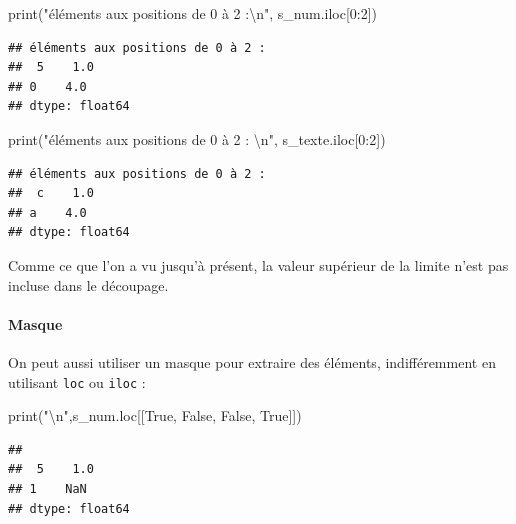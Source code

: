 \documentclass[12pt,]{book}
\newenvironment{Shaded}{\begin{snugshade}}{\end{snugshade}}
\newcommand{\DecValTok}[1]{\textcolor[rgb]{0.00,0.00,0.81}{#1}}
\newcommand{\CharTok}[1]{\textcolor[rgb]{0.31,0.60,0.02}{#1}}
\newcommand{\StringTok}[1]{\textcolor[rgb]{0.31,0.60,0.02}{#1}}
\newcommand{\VariableTok}[1]{\textcolor[rgb]{0.00,0.00,0.00}{#1}}
\newcommand{\BuiltInTok}[1]{#1}
\newcommand{\NormalTok}[1]{#1}
\let\oldparagraph\paragraph
\renewcommand{\paragraph}[1]{\oldparagraph{#1}\mbox{}}
\numberwithin{equation}{section}
\numberwithin{countremarque}{section}
\begin{document}
\begin{Shaded}
\begin{Highlighting}[]
\BuiltInTok{print}\NormalTok{(}\StringTok{"éléments aux positions de 0 à 2 :}\CharTok{\textbackslash{}n}\StringTok{"}\NormalTok{, s_num.iloc[}\DecValTok{0}\NormalTok{:}\DecValTok{2}\NormalTok{])}
\end{Highlighting}
\end{Shaded}

\begin{lstlisting}
## éléments aux positions de 0 à 2 :
##  5    1.0
## 0    4.0
## dtype: float64
\end{lstlisting}

\begin{Shaded}
\begin{Highlighting}[]
\BuiltInTok{print}\NormalTok{(}\StringTok{"éléments aux positions de 0 à 2 : }\CharTok{\textbackslash{}n}\StringTok{"}\NormalTok{, s_texte.iloc[}\DecValTok{0}\NormalTok{:}\DecValTok{2}\NormalTok{])}
\end{Highlighting}
\end{Shaded}

\begin{lstlisting}
## éléments aux positions de 0 à 2 : 
##  c    1.0
## a    4.0
## dtype: float64
\end{lstlisting}

Comme ce que l'on a vu jusqu'à présent, la valeur supérieur de la limite
n'est pas incluse dans le découpage.

\paragraph{Masque}\label{masque}

On peut aussi utiliser un masque pour extraire des éléments,
indifféremment en utilisant \texttt{loc} ou \texttt{iloc} :

\begin{Shaded}
\begin{Highlighting}[]
\BuiltInTok{print}\NormalTok{(}\StringTok{"}\CharTok{\textbackslash{}n}\StringTok{"}\NormalTok{,s_num.loc[[}\VariableTok{True}\NormalTok{, }\VariableTok{False}\NormalTok{, }\VariableTok{False}\NormalTok{, }\VariableTok{True}\NormalTok{]])}
\end{Highlighting}
\end{Shaded}

\begin{lstlisting}
## 
##  5    1.0
## 1    NaN
## dtype: float64
\end{lstlisting}
\end{document}
